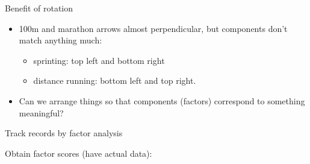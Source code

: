 \begin{frame}{Benefit of rotation}
  
  \begin{itemize}
  \item 100m and marathon arrows almost perpendicular, but components
    don't match anything much:
    \begin{itemize}
    \item sprinting: top left and bottom right
    \item distance running: bottom left and top right.
    \end{itemize}
  \item Can we arrange things so that components (factors) correspond
    to something meaningful?
  \end{itemize}
  
\end{frame}

\begin{frame}[fragile]{Track records by factor analysis}

  Obtain factor scores (have actual data):
  
\begin{knitrout}
\color{fgcolor}\begin{kframe}
\begin{alltt}
\hlkwb{=}\hlstd{(}\hlstd{,}
\hlkwb{=}\hlstd{(track[,}\hlopt{-}\hlstd{],}\hlstd{,}\hlstd{=}\hlstd{)}
\end{alltt}
\end{kframe}
\end{knitrout}
  
\end{frame}

